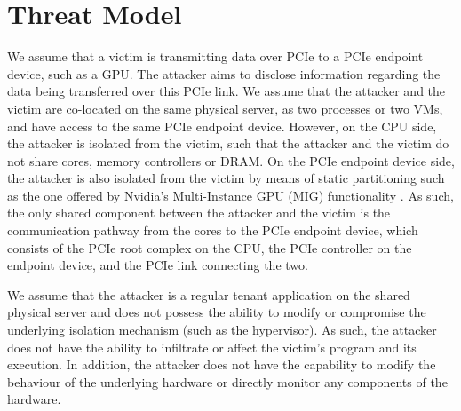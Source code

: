 \section{Threat Model}
\label{sec:interconnect-sc-threat-model}

We assume that a victim is transmitting data over PCIe to a PCIe endpoint device, such as a GPU.
The attacker aims to disclose information regarding the data being transferred over this PCIe link.
We assume that the attacker and the victim are co-located on the same physical server, as two processes or two VMs, and have access to the same PCIe endpoint device.
However, on the CPU side, the attacker is isolated from the victim, such that the attacker and the victim do not share cores, memory controllers or DRAM.
On the PCIe endpoint device side, the attacker is also isolated from the victim by means of static partitioning such as the one offered by Nvidia's Multi-Instance GPU (MIG) functionality \cite{nvidia_mig_guide}.
As such, the only shared component between the attacker and the victim is the communication pathway from the cores to the PCIe endpoint device, which consists of the PCIe root complex on the CPU, the PCIe controller on the endpoint device, and the PCIe link connecting the two.

We assume that the attacker is a regular tenant application on the shared physical server and does not possess the ability to modify or compromise the underlying isolation mechanism (such as the hypervisor).
As such, the attacker does not have the ability to infiltrate or affect the victim's program and its execution.
In addition, the attacker does not have the capability to modify the behaviour of the underlying hardware or directly monitor any components of the hardware.

